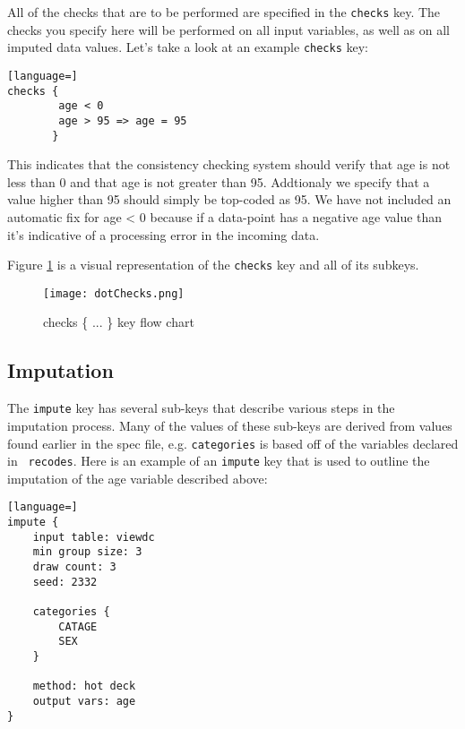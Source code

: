 \documentclass{article}
\begin{document}
All of the checks that are to be performed are specified in the {\tt checks} key. 
The checks you specify here will be performed on all input variables, as well as on all 
imputed data values. Let's take a look at an example {\tt checks} key:

\begin{lstlisting}[language=]
checks {
    	age < 0
        age > 95 => age = 95
       }
\end{lstlisting}

This indicates that the consistency checking system should verify that age is not less
than 0 and that age is not greater than 95. Addtionaly we specify that a value higher
than 95 should simply be top-coded as 95. We have not included an automatic fix for
age < 0 because if a data-point has a negative age value than it's indicative of a
processing error in the incoming data.

Figure \ref{checkflow} is a visual representation of the {\tt checks} key and all of its subkeys.

\begin{figure}
\begin{center}
\texttt{[image: dotChecks.png]}
\caption{checks \{ ... \} key flow chart}\label{checkflow}
\end{center}
\end{figure}


\subsection{Imputation} \label{imputesec}
The {\tt impute} key has several sub-keys that describe various steps in the imputation
process. Many of the values of these sub-keys are derived from values found earlier
in the spec file, e.g. {\tt categories} is based off of the variables declared in {\tt
recodes}. Here is an example of an {\tt impute} key that is used to
outline the imputation of the age variable described above:

\begin{lstlisting}[language=]
impute {
    input table: viewdc
    min group size: 3
    draw count: 3
    seed: 2332

    categories {
        CATAGE
        SEX
    }

    method: hot deck
    output vars: age
}
\end{lstlisting}
\end{document}
